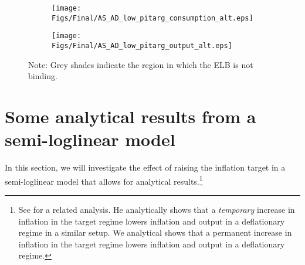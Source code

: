 \documentclass[11pt]{article}
\begin{document}
\begin{singlespace}
		\begin{figure}[H]
			\caption{AD and AS Curves in the Deflationary Regime\\---Low $\Pi^{targ}$---} \label{fig:ASAD_low_pitarg}
	        \vspace{-1em}
			\begin{center}
				\begin{subfigure}[b]{0.4\textwidth}
					\centering
					\texttt{[image: Figs/Final/AS\_AD\_low\_pitarg\_consumption\_alt.eps]}
				\end{subfigure}
				\hspace{0.5cm}  
				\begin{subfigure}[b]{0.4\textwidth}
					\centering
					\texttt{[image: Figs/Final/AS\_AD\_low\_pitarg\_output\_alt.eps]}
				\end{subfigure}
			\end{center}
	        \vspace{-1em}
			{\footnotesize Note: Grey shades indicate the region in which the ELB is not binding.}
		\end{figure}

		\section{Some analytical results from a semi-loglinear model}
		\label{A:SemiLoglinearModel}
		
		In this section, we will investigate the effect of raising the inflation target in a semi-loglinear model that allows for analytical results.\footnote{See \citet{Bilbiie2018} for a related analysis. He analytically shows that a \textit{temporary} increase in inflation in the target regime lowers inflation and output in a deflationary regime in a similar setup. We analytical shows that a permanent increase in inflation in the target regime lowers inflation and output in a deflationary regime.}
		

\end{singlespace}
\end{document}
